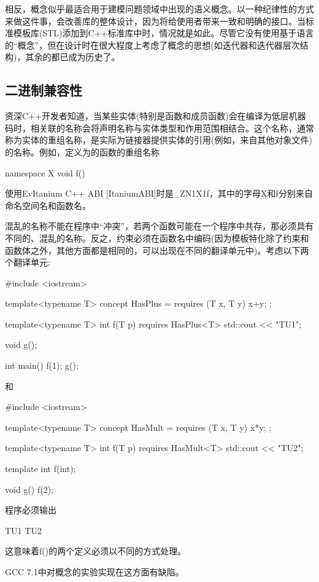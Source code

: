 相反，概念似乎最适合用于建模问题领域中出现的语义概念。以一种纪律性的方式来做这件事，会改善库的整体设计，因为将给使用者带来一致和明确的接口。当标准模板库(STL)添加到C++标准库中时，情况就是如此。尽管它没有使用基于语言的“概念”，但在设计时在很大程度上考虑了概念的思想(如迭代器和迭代器层次结构)，其余的都已成为历史了。

\subsection{二进制兼容性}

资深C++开发者知道，当某些实体(特别是函数和成员函数)会在编译为低层机器码时，相关联的名称会将声明名称与实体类型和作用范围相结合。这个名称，通常称为实体的重组名称，是实际为链接器提供实体的引用(例如，来自其他对象文件)的名称。例如，定义为的函数的重组名称

\begin{cpp}
namespace X {
	void f() {}
}
\end{cpp}

使用EvItanium C++ ABI [ItaniumABI]时是\_ZN1X1f，其中的字母X和f分别来自命名空间名和函数名。

混乱的名称不能在程序中“冲突”，若两个函数可能在一个程序中共存，那必须具有不同的、混乱的名称。反之，约束必须在函数名中编码(因为模板特化除了约束和函数体之外，其他方面都是相同的，可以出现在不同的翻译单元中)。考虑以下两个翻译单元:

\begin{cpp}
#include <iostream>

template<typename T>
concept HasPlus = requires (T x, T y) {
	x+y;
};

template<typename T> int f(T p) requires HasPlus<T> {
	std::cout << "TU1\n";
}

void g();

int main() {
	f(1);
	g();
}
\end{cpp}

和

\begin{cpp}
#include <iostream>

template<typename T>
concept HasMult = requires (T x, T y) {
	x*y;
};

template<typename T> int f(T p) requires HasMult<T> {
	std::cout << "TU2\n";
}

template int f(int);

void g() {
	f(2);
}
\end{cpp}

程序必须输出

\begin{shell}
TU1
TU2
\end{shell}

这意味着f()的两个定义必须以不同的方式处理。

\begin{notice}
GCC 7.1中对概念的实验实现在这方面有缺陷。
\end{notice}























